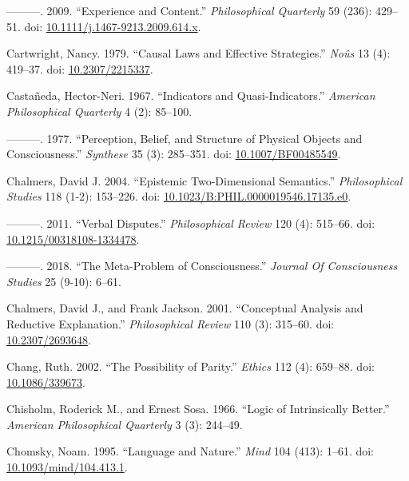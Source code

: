 \documentclass[
  10pt,
  letterpaper,
  DIV=11,
  numbers=noendperiod,
  twoside]{scrartcl}
\newlength{\cslhangindent}
\newenvironment{CSLReferences}[2] %
 {\begin{list}{}{%
  \setlength{\itemindent}{0pt}
  \setlength{\leftmargin}{0pt}
  \setlength{\parsep}{0pt}
  \ifodd #1
   \setlength{\leftmargin}{\cslhangindent}
   \setlength{\itemindent}{-1\cslhangindent}
  \fi
  \setlength{\itemsep}{#2\baselineskip}}}
 {\end{list}}
\begin{document}
\begin{CSLReferences}{1}{0}
---------. 2009. {``Experience and Content.''} \emph{Philosophical
Quarterly} 59 (236): 429--51. doi:
\href{https://doi.org/10.1111/j.1467-9213.2009.614.x}{10.1111/j.1467-9213.2009.614.x}.

Cartwright, Nancy. 1979. {``Causal Laws and Effective Strategies.''}
\emph{Noûs} 13 (4): 419--37. doi:
\href{https://doi.org/10.2307/2215337}{10.2307/2215337}.

Castañeda, Hector-Neri. 1967. {``Indicators and Quasi-Indicators.''}
\emph{American Philosophical Quarterly} 4 (2): 85--100.

---------. 1977. {``Perception, Belief, and Structure of Physical
Objects and Consciousness.''} \emph{Synthese} 35 (3): 285--351. doi:
\href{https://doi.org/10.1007/BF00485549}{10.1007/BF00485549}.

Chalmers, David J. 2004. {``Epistemic Two-Dimensional Semantics.''}
\emph{Philosophical Studies} 118 (1-2): 153--226. doi:
\href{https://doi.org/10.1023/B:PHIL.0000019546.17135.e0}{10.1023/B:PHIL.0000019546.17135.e0}.

---------. 2011. {``Verbal Disputes.''} \emph{Philosophical Review} 120
(4): 515--66. doi:
\href{https://doi.org/10.1215/00318108-1334478}{10.1215/00318108-1334478}.

---------. 2018. {``The Meta-Problem of Consciousness.''} \emph{Journal
Of Consciousness Studies} 25 (9-10): 6--61.

Chalmers, David J., and Frank Jackson. 2001. {``Conceptual Analysis and
Reductive Explanation.''} \emph{Philosophical Review} 110 (3): 315--60.
doi: \href{https://doi.org/10.2307/2693648}{10.2307/2693648}.

Chang, Ruth. 2002. {``The Possibility of Parity.''} \emph{Ethics} 112
(4): 659--88. doi:
\href{https://doi.org/10.1086/339673}{10.1086/339673}.

Chisholm, Roderick M., and Ernest Sosa. 1966. {``Logic of Intrinsically
Better.''} \emph{American Philosophical Quarterly} 3 (3): 244--49.

Chomsky, Noam. 1995. {``Language and Nature.''} \emph{Mind} 104 (413):
1--61. doi:
\href{https://doi.org/10.1093/mind/104.413.1}{10.1093/mind/104.413.1}.


\end{CSLReferences}
\end{document}
